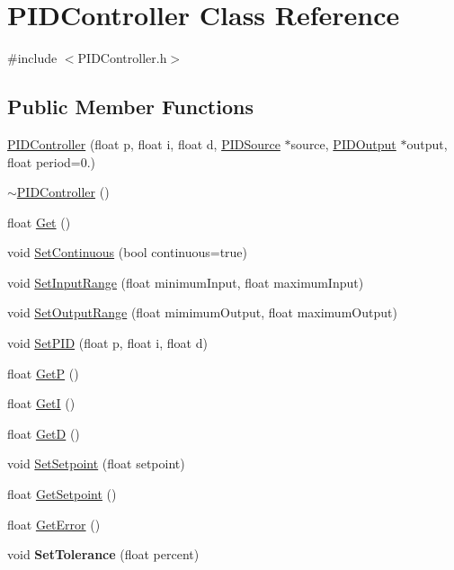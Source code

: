 \hypertarget{classPIDController}{\section{\-P\-I\-D\-Controller \-Class \-Reference}
\label{classPIDController}
}


{\ttfamily \#include $<$\-P\-I\-D\-Controller.\-h$>$}

\subsection*{\-Public \-Member \-Functions}
\begin{DoxyCompactItemize}
\item 
\hyperlink{classPIDController_aeb0e62ab4c39e61826b71b4177eb97d5}{\-P\-I\-D\-Controller} (float p, float i, float d, \hyperlink{classPIDSource}{\-P\-I\-D\-Source} $\ast$source, \hyperlink{classPIDOutput}{\-P\-I\-D\-Output} $\ast$output, float period=0.)
\item 
\hyperlink{classPIDController_a690e7ad4796e5c5143aa4b90f2f6677b}{$\sim$\-P\-I\-D\-Controller} ()
\item 
float \hyperlink{classPIDController_a5d096c87981f6612fe0cf496cea9772a}{\-Get} ()
\item 
void \hyperlink{classPIDController_adc068e4069028a0546fad0bee0ef32ca}{\-Set\-Continuous} (bool continuous=true)
\item 
void \hyperlink{classPIDController_aa105ab2c2020dfc767fe9b585be0103a}{\-Set\-Input\-Range} (float minimum\-Input, float maximum\-Input)
\item 
void \hyperlink{classPIDController_afa64ecde5d075a47a4cd1431f77b6060}{\-Set\-Output\-Range} (float mimimum\-Output, float maximum\-Output)
\item 
void \hyperlink{classPIDController_a1e4bf6acfb4eccb1b38f3f74ef74f995}{\-Set\-P\-I\-D} (float p, float i, float d)
\item 
float \hyperlink{classPIDController_a9572c875b0fee00189e7e22250db3831}{\-Get\-P} ()
\item 
float \hyperlink{classPIDController_aad4c914184a37b8ceb85401d59ff163b}{\-Get\-I} ()
\item 
float \hyperlink{classPIDController_a003738f4df587babc119131cdfada553}{\-Get\-D} ()
\item 
void \hyperlink{classPIDController_a60e89182f28d2cc1ee5adf481c2003c9}{\-Set\-Setpoint} (float setpoint)
\item 
float \hyperlink{classPIDController_ac25eb01ba2a0118f692bae207de62d63}{\-Get\-Setpoint} ()
\item 
float \hyperlink{classPIDController_aba10571498bacd21469121d4af1f4757}{\-Get\-Error} ()
\item 
\hypertarget{classPIDController_a86cba2e65c803b3f3d2c63ea0dfdaec4}{void {\bfseries \-Set\-Tolerance} (float percent)}\label{classPIDController_a86cba2e65c803b3f3d2c63ea0dfdaec4}


\end{DoxyCompactItemize}
